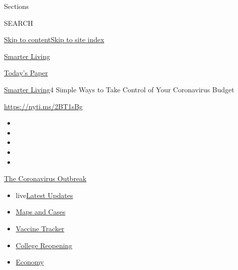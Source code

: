 Sections

SEARCH

\protect\hyperlink{site-content}{Skip to
content}\protect\hyperlink{site-index}{Skip to site index}

\href{https://www.nytimes3xbfgragh.onion/section/smarter-living}{Smarter
Living}

\href{https://myaccount.nytimes3xbfgragh.onion/auth/login?response_type=cookie\&client_id=vi}{}

\href{https://www.nytimes3xbfgragh.onion/section/todayspaper}{Today's
Paper}

\href{/section/smarter-living}{Smarter Living}\textbar{}4 Simple Ways to
Take Control of Your Coronavirus Budget

\url{https://nyti.ms/2BT1sBg}

\begin{itemize}
\item
\item
\item
\item
\item
\end{itemize}

\href{https://www.nytimes3xbfgragh.onion/news-event/coronavirus?action=click\&pgtype=Article\&state=default\&region=TOP_BANNER\&context=storylines_menu}{The
Coronavirus Outbreak}

\begin{itemize}
\tightlist
\item
  live\href{https://www.nytimes3xbfgragh.onion/2020/08/04/world/coronavirus-cases.html?action=click\&pgtype=Article\&state=default\&region=TOP_BANNER\&context=storylines_menu}{Latest
  Updates}
\item
  \href{https://www.nytimes3xbfgragh.onion/interactive/2020/us/coronavirus-us-cases.html?action=click\&pgtype=Article\&state=default\&region=TOP_BANNER\&context=storylines_menu}{Maps
  and Cases}
\item
  \href{https://www.nytimes3xbfgragh.onion/interactive/2020/science/coronavirus-vaccine-tracker.html?action=click\&pgtype=Article\&state=default\&region=TOP_BANNER\&context=storylines_menu}{Vaccine
  Tracker}
\item
  \href{https://www.nytimes3xbfgragh.onion/2020/08/02/us/covid-college-reopening.html?action=click\&pgtype=Article\&state=default\&region=TOP_BANNER\&context=storylines_menu}{College
  Reopening}
\item
  \href{https://www.nytimes3xbfgragh.onion/live/2020/08/04/business/stock-market-today-coronavirus?action=click\&pgtype=Article\&state=default\&region=TOP_BANNER\&context=storylines_menu}{Economy}
\end{itemize}

